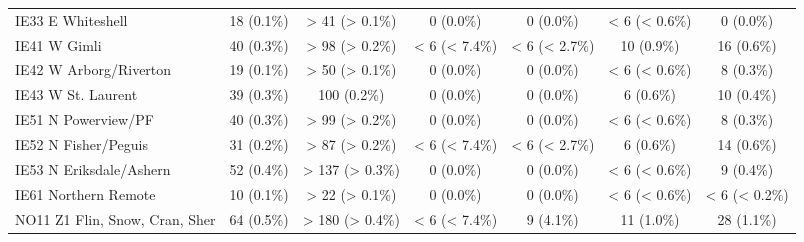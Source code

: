 \documentclass{article}
\begin{document}
\begin{table}[htbp]
\begin{longtable}{l*{6}{c}}
  IE33 E Whiteshell                                     &            18 (0.1\%)           &          > 41 (> 0.1\%)         &            0 (0.0\%)            &            0 (0.0\%)            &          < 6 (< 0.6\%)          &            0 (0.0\%)            \\
  IE41 W Gimli                                          &            40 (0.3\%)           &          > 98 (> 0.2\%)         &          < 6 (< 7.4\%)          &          < 6 (< 2.7\%)          &            10 (0.9\%)           &            16 (0.6\%)           \\
  IE42 W Arborg/Riverton                                &            19 (0.1\%)           &          > 50 (> 0.1\%)         &            0 (0.0\%)            &            0 (0.0\%)            &          < 6 (< 0.6\%)          &            8 (0.3\%)            \\
  IE43 W St. Laurent                                    &            39 (0.3\%)           &           100 (0.2\%)           &            0 (0.0\%)            &            0 (0.0\%)            &            6 (0.6\%)            &            10 (0.4\%)           \\
  IE51 N Powerview/PF                                   &            40 (0.3\%)           &          > 99 (> 0.2\%)         &            0 (0.0\%)            &            0 (0.0\%)            &          < 6 (< 0.6\%)          &            8 (0.3\%)            \\
  IE52 N Fisher/Peguis                                  &            31 (0.2\%)           &          > 87 (> 0.2\%)         &          < 6 (< 7.4\%)          &          < 6 (< 2.7\%)          &            6 (0.6\%)            &            14 (0.6\%)           \\
  IE53 N Eriksdale/Ashern                               &            52 (0.4\%)           &         > 137 (> 0.3\%)         &            0 (0.0\%)            &            0 (0.0\%)            &          < 6 (< 0.6\%)          &            9 (0.4\%)            \\
  IE61 Northern Remote                                  &            10 (0.1\%)           &          > 22 (> 0.1\%)         &            0 (0.0\%)            &            0 (0.0\%)            &          < 6 (< 0.6\%)          &          < 6 (< 0.2\%)          \\
  NO11 Z1 Flin, Snow, Cran, Sher                        &            64 (0.5\%)           &         > 180 (> 0.4\%)         &          < 6 (< 7.4\%)          &            9 (4.1\%)            &            11 (1.0\%)           &            28 (1.1\%)           \\

\end{longtable}
\end{table}
\end{document}
